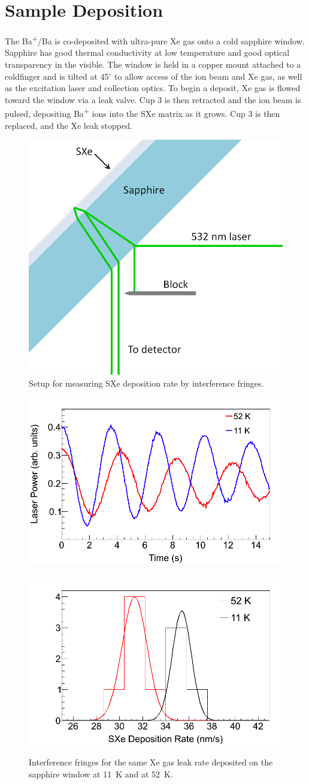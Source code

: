 \section{Sample Deposition}
\label{sec:deposition}

The Ba\textsuperscript{+}/Ba is co-deposited with ultra-pure Xe gas onto a cold sapphire window.  Sapphire has good thermal conductivity at low temperature and good optical transparency in the visible.  The window is held in a copper mount attached to a coldfinger and is tilted at 45$^{\circ}$ to allow access of the ion beam and Xe gas, as well as the excitation laser and collection optics.  To begin a deposit, Xe gas is flowed toward the window via a leak valve.  Cup 3 is then retracted and the ion beam is pulsed, depositing Ba\textsuperscript{+} ions into the SXe matrix as it grows.  Cup 3 is then replaced, and the Xe leak stopped.

\begin{figure} %
        \centering
                \includegraphics[width=.4\textwidth]{figures/fringe_setup.png}
                \caption{Setup for measuring SXe deposition rate by interference fringes.}
\label{fig:fringe_setup}
\end{figure}

\begin{figure} %
        \centering
                \includegraphics[width=.5\textwidth]{figures/fringes_52K_vs_11K.png}
                ~
                \includegraphics[width=.5\textwidth]{figures/fringes_52K_vs_11K_statistics.png}
                \caption{Interference fringes for the same Xe gas leak rate deposited on the sapphire window at 11~K and at 52~K.}
\label{fig:fringes_52K_vs_11K}
\end{figure}


